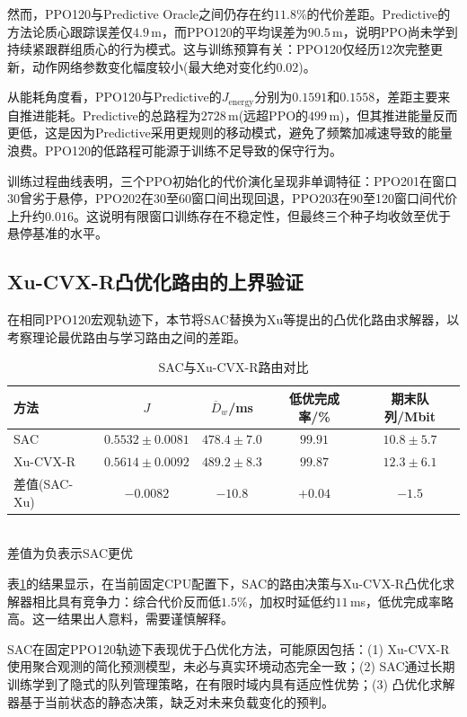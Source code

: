 然而，PPO120与Predictive Oracle之间仍存在约$11.8\%$的代价差距。Predictive的方法论质心跟踪误差仅$4.9\,$m，而PPO120的平均误差为$90.5\,$m，说明PPO尚未学到持续紧跟群组质心的行为模式。这与训练预算有关：PPO120仅经历12次完整更新，动作网络参数变化幅度较小(最大绝对变化约$0.02$)。

从能耗角度看，PPO120与Predictive的$J_{\mathrm{energy}}$分别为$0.1591$和$0.1558$，差距主要来自推进能耗。Predictive的总路程为$2728\,$m(远超PPO的$499\,$m)，但其推进能量反而更低，这是因为Predictive采用更规则的移动模式，避免了频繁加减速导致的能量浪费。PPO120的低路程可能源于训练不足导致的保守行为。

训练过程曲线表明，三个PPO初始化的代价演化呈现非单调特征：PPO201在窗口30曾劣于悬停，PPO202在30至60窗口间出现回退，PPO203在90至120窗口间代价上升约$0.016$。这说明有限窗口训练存在不稳定性，但最终三个种子均收敛至优于悬停基准的水平。

\subsection{Xu-CVX-R凸优化路由的上界验证}
\label{ssec:cvx_upper_bound}

在相同PPO120宏观轨迹下，本节将SAC替换为Xu等提出的凸优化路由求解器，以考察理论最优路由与学习路由之间的差距。

\begin{table}[htbp]
\centering
\caption{SAC与Xu-CVX-R路由对比}
\label{tab:cvx_comparison}
\begin{tabular}{lcccc}
\toprule
方法 & $J$ & $\overline D_w$/ms & 低优完成率/\% & 期末队列/Mbit \\
\midrule
SAC & $0.5532\pm0.0081$ & $478.4\pm7.0$ & $99.91$ & $10.8\pm5.7$ \\
Xu-CVX-R & $0.5614\pm0.0092$ & $489.2\pm8.3$ & $99.87$ & $12.3\pm6.1$ \\
差值(SAC-Xu) & $-0.0082$ & $-10.8$ & $+0.04$ & $-1.5$ \\
\bottomrule
\end{tabular}
\\[3pt]
\scriptsize 差值为负表示SAC更优
\end{table}

表\ref{tab:cvx_comparison}的结果显示，在当前固定CPU配置下，SAC的路由决策与Xu-CVX-R凸优化求解器相比具有竞争力：综合代价反而低$1.5\%$，加权时延低约$11\,$ms，低优完成率略高。这一结果出人意料，需要谨慎解释。

SAC在固定PPO120轨迹下表现优于凸优化方法，可能原因包括：(1) Xu-CVX-R使用聚合观测的简化预测模型，未必与真实环境动态完全一致；(2) SAC通过长期训练学到了隐式的队列管理策略，在有限时域内具有适应性优势；(3) 凸优化求解器基于当前状态的静态决策，缺乏对未来负载变化的预判。

